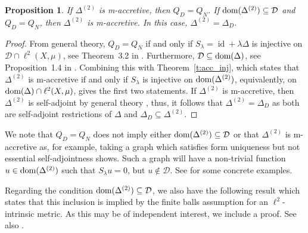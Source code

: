 \documentclass[letterpaper]{article}
\newtheorem{proposition}[lemma]{Proposition}
\theoremstyle{definition}
\theoremstyle{named}
\numberwithin{equation}{section}
\newcommand{\QD}{Q_{D}}
\newcommand{\QN}{Q_{N}}
\newcommand{\D}{\mathcal{D}}
\newcommand{\lm}{\lambda}
\newcommand{\dom}{\textnormal{dom}} %
\newcommand{\id}{\operatorname{id}}
\begin{document}
\begin{proposition}\label{p:MU}
If $\Delta^{(2)}$ is m-accretive, then $\QD=\QN$. If $\dom(\Delta^{(2)}) \subseteq \D$
and $\QD=\QN$, then $\Delta^{(2)}$ is m-accretive.
In this case, $\Delta^{(2)}=\Delta_D$.
\end{proposition}
\begin{proof}
    From general theory, $\QD=\QN$ if and only if $S_\lm=\id+\lm \Delta$ is injective
    on $\D \cap \ell^2(X,\mu)$, see Theorem~3.2
    in \cite{keller2021graphs}. Furthermore, $\D \subseteq \dom(\Delta)$, see Proposition~1.4 in \cite{keller2021graphs}.
    Combining this with Theorem~\ref{t:acc_inj}, which
    states that $\Delta^{(2)}$ is m-accretive if and only if $S_\lm$ is
    injective on $\dom(\Delta^{(2)})$, equivalently, on $\dom(\Delta) \cap \ell^2(X,\mu)$,
    gives the first two statements. If $\Delta^{(2)}$ is m-accretive, then
    $\Delta^{(2)}$ is self-adjoint by general theory \cite{kato2013perturbation}, 
thus, it follows that $\Delta^{(2)}=\Delta_D$ as both are self-adjoint
    restrictions of $\Delta$ and $\Delta_D \subseteq \Delta^{(2)}$. 
\end{proof}


We note that $\QD=\QN$ does not imply either $\dom(\Delta^{(2)}) \subseteq \D$ or that $\Delta^{(2)}$
is m-accretive as, for example,
taking a graph which satisfies form uniqueness but not essential self-adjointness shows.
Such a graph will have a non-trivial function $u \in \dom(\Delta^{(2)})$ such that $S_\lm u=0$, but $u \not \in \D$. 
See \cite{HKMW13, HKMRW} for some concrete examples.

Regarding the condition $\dom(\Delta^{(2)}) \subseteq \D$, we also have the following result which states
that this inclusion is implied by the finite balls assumption for an $\ell^2$-intrinsic metric. As this may be of independent interest, we include
a proof. See also \cite{HM15}. 
\end{document}

